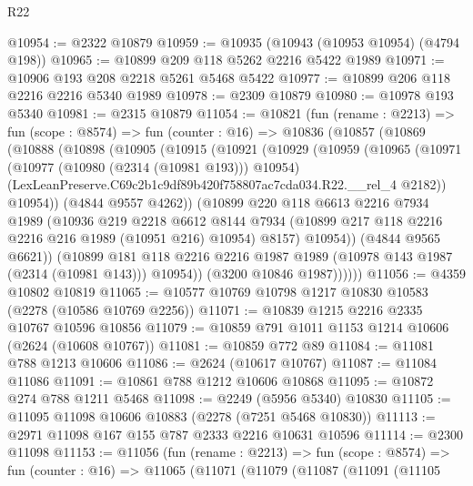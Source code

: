 \begin{lexlean}{R22}
\begin{coremodule}
@10954 := @2322 @10879
@10959 := @10935 (@10943 (@10953 @10954) (@4794 @198))
@10965 := @10899 @209 @118 @5262 @2216 @5422 @1989
@10971 := @10906 @193 @208 @2218 @5261 @5468 @5422
@10977 := @10899 @206 @118 @2216 @2216 @5340 @1989
@10978 := @2309 @10879
@10980 := @10978 @193 @5340
@10981 := @2315 @10879
@11054 := @10821
    (fun (rename : @2213) =>
    fun (scope : @8574) =>
    fun (counter : @16) =>
    @10836
      (@10857
        (@10869
          (@10888
            (@10898
              (@10905
                (@10915
                  (@10921
                    (@10929
                      (@10959
                        (@10965
                          (@10971
                            (@10977 (@10980 (@2314 (@10981 @193))) @10954)
                            (LexLeanPreserve.C69c2b1c9df89b420f758807ac7cda034.R22.__rel_4 @2182))
                          @10954))
                      (@4844 @9557 @4262))
                    (@10899
                      @220
                      @118
                      @6613
                      @2216
                      @7934
                      @1989
                      (@10936
                        @219
                        @2218
                        @6612
                        @8144
                        @7934
                        (@10899 @217 @118 @2216 @2216 @216 @1989 (@10951 @216) @10954)
                        @8157)
                      @10954))
                  (@4844 @9565 @6621))
                (@10899
                  @181
                  @118
                  @2216
                  @2216
                  @1987
                  @1989
                  (@10978 @143 @1987 (@2314 (@10981 @143)))
                  @10954))
              (@3200 @10846 @1987))))))
@11056 := @4359 @10802 @10819
@11065 := @10577 @10769 @10798 @1217 @10830 @10583 (@2278 (@10586 @10769 @2256))
@11071 := @10839 @1215 @2216 @2335 @10767 @10596 @10856
@11079 := @10859 @791 @1011 @1153 @1214 @10606 (@2624 (@10608 @10767))
@11081 := @10859 @772 @89
@11084 := @11081 @788 @1213 @10606
@11086 := @2624 (@10617 @10767)
@11087 := @11084 @11086
@11091 := @10861 @788 @1212 @10606 @10868
@11095 := @10872 @274 @788 @1211 @5468
@11098 := @2249 (@5956 @5340) @10830
@11105 := @11095 @11098 @10606 @10883 (@2278 (@7251 @5468 @10830))
@11113 := @2971 @11098 @167 @155 @787 @2333 @2216 @10631 @10596
@11114 := @2300 @11098
@11153 := @11056
    (fun (rename : @2213) =>
    fun (scope : @8574) =>
    fun (counter : @16) =>
    @11065
      (@11071
        (@11079
          (@11087
            (@11091
              (@11105

\end{coremodule}
\end{lexlean}
